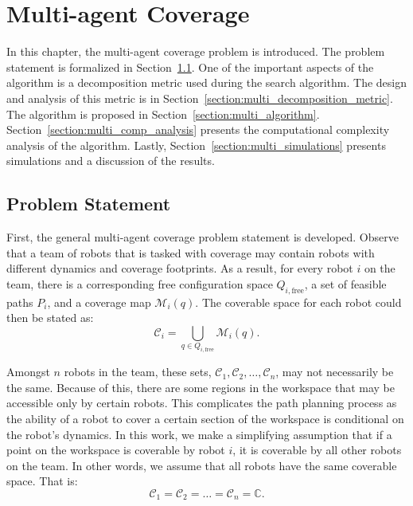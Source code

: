 \documentclass[../main.tex]{subfiles}
\begin{document}
\chapter{Multi-agent Coverage}
\label{chapter:multi_agent_coverage}

In this chapter, the multi-agent coverage problem is introduced. The problem statement is formalized in Section~\ref{section:multi_agent_problem_statement}. One of the important aspects of the algorithm is a decomposition metric used during the search algorithm. The design and analysis of this metric is in Section~\ref{section:multi_decomposition_metric}. The algorithm is proposed in Section~\ref{section:multi_algorithm}. Section~\ref{section:multi_comp_analysis} presents the computational complexity analysis of the algorithm. Lastly, Section~\ref{section:multi_simulations} presents simulations and a discussion of the results.


\section{Problem Statement}
\label{section:multi_agent_problem_statement}

First, the general multi-agent coverage problem statement is developed. Observe that a team of robots that is tasked with coverage may contain robots with different dynamics and coverage footprints. As a result, for every robot $i$ on the team, there is a corresponding free configuration space $Q_{i,\text{free}}$, a set of feasible paths $P_i$, and a coverage map $\mathcal{M}_i(q)$. The coverable space for each robot could then be stated as:
\begin{equation}
	\mathcal{C}_i=\bigcup_{q\in Q_{i,\text{free}}}\mathcal{M}_i(q).
\end{equation}

Amongst $n$ robots in the team, these sets, $\mathcal{C}_1, \mathcal{C}_2,\ldots,\mathcal{C}_n$, may not necessarily be the same. Because of this, there are some regions in the workspace that may be accessible only by certain robots. This complicates the path planning process as the ability of a robot to cover a certain section of the workspace is conditional on the robot's dynamics. In this work, we make a simplifying assumption that if a point on the workspace is coverable by robot $i$, it is coverable by all other robots on the team. In other words, we assume that all robots have the same coverable space. That is:
\begin{equation}
	\mathcal{C}_1=\mathcal{C}_2=\ldots=\mathcal{C}_n=\mathbb{C}.
\end{equation}
\end{document}
